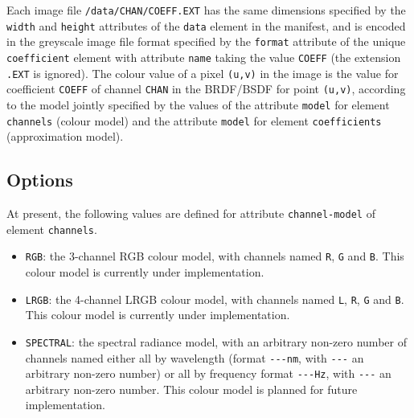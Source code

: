 Each image file \texttt{/data/CHAN/COEFF.EXT} has the same dimensions
specified by the \texttt{width} and \texttt{height} attributes of the
\texttt{data} element in the manifest, and is encoded in the greyscale
image file format specified by the \texttt{format} attribute of the
unique \texttt{coefficient} element with attribute \texttt{name} taking
the value \texttt{COEFF} (the extension \texttt{.EXT} is ignored). The
colour value of a pixel \texttt{(u,v)} in the image is the value for
coefficient \texttt{COEFF} of channel \texttt{CHAN} in the BRDF/BSDF for
point \texttt{(u,v)}, according to the model jointly specified by the
values of the attribute \texttt{model} for element \texttt{channels}
(colour model) and the attribute \texttt{model} for element
\texttt{coefficients} (approximation model).

\hypertarget{options}{%
\subsection{Options}\label{options}}

At present, the following values are defined for attribute
\texttt{channel-model} of element \texttt{channels}.
\begin{itemize}
\item \texttt{RGB}: the
3-channel RGB colour model, with channels named \texttt{R}, \texttt{G}
and \texttt{B}. This colour model is currently under implementation.
\item \texttt{LRGB}: the 4-channel LRGB colour model, with channels named
\texttt{L}, \texttt{R}, \texttt{G} and \texttt{B}. This colour model is
currently under implementation.
\item \texttt{SPECTRAL}: the spectral
radiance model, with an arbitrary non-zero number of channels named
either all by wavelength (format \texttt{-\/-\/-nm}, with
\texttt{-\/-\/-} an arbitrary non-zero number) or all by frequency
format \texttt{-\/-\/-Hz}, with \texttt{-\/-\/-} an arbitrary non-zero
number. This colour model is planned for future implementation.
\end{itemize}

